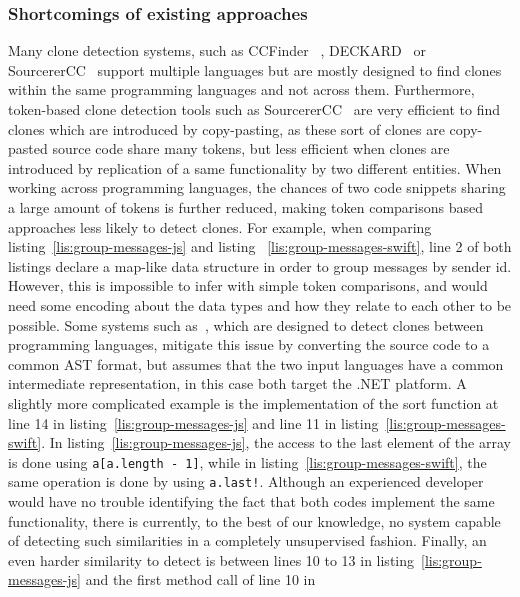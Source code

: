 \subsubsection{\label{sssec:shortcomings} Shortcomings of existing approaches}
Many clone detection systems, such as CCFinder~%
\cite{Kamiya:2002:CMT:636188.636191}, DECKARD~%
\cite{Jiang:2007:DSA:1248820.1248843} or SourcererCC~%
\cite{Sajnani:2016:SSC:2884781.2884877} support multiple languages but are
mostly designed to find clones within the same programming languages and not
across them. Furthermore, token-based clone detection tools
such as SourcererCC~\cite{Sajnani:2016:SSC:2884781.2884877} are very efficient
to find clones which are introduced by copy-pasting, as these sort of clones
are copy-pasted source code share many tokens, but less efficient when clones
are introduced by replication of a same functionality by two different entities.
When working across programming languages, the chances of two code snippets
sharing a large amount of tokens is further reduced, making token comparisons
based approaches less likely to detect clones.
For example, when comparing listing~\ref{lis:group-messages-js} and listing
~\ref{lis:group-messages-swift}, line 2 of both listings declare a map-like
data structure in order to group messages by sender id. However, this is
impossible to infer with simple token comparisons, and would need some encoding
about the data types and how they relate to each other to be possible. Some
systems such as~\cite{kraft2008cross}, which are designed to detect clones
between programming languages, mitigate this issue by converting the
source code to a common AST format, but assumes that the two input languages
have a common intermediate representation, in this case both target the .NET
platform.
A slightly more complicated example is the implementation of the sort function
at line 14 in listing~\ref{lis:group-messages-js} and line 11 in
listing~\ref{lis:group-messages-swift}. In listing~\ref{lis:group-messages-js},
the access to the last element of the array is done using
\lstinline{a[a.length - 1]}, while in listing~\ref{lis:group-messages-swift},
the same operation is done by using \lstinline{a.last!}. Although an experienced
developer would have no trouble identifying the fact that both codes implement
the same functionality, there is currently, to the best of our knowledge, no
system capable of detecting such similarities in a completely unsupervised
fashion. Finally, an even harder similarity to detect is between lines 10 to 13
in listing~\ref{lis:group-messages-js} and the first method call of line 10 in
